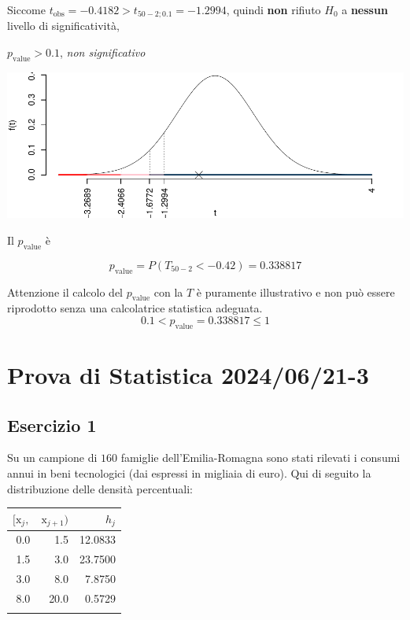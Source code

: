 \documentclass[
  11pt,
]{book}
\theoremstyle{mytheoremstyle}
\theoremstyle{mydefstyle}
\newenvironment{sol}
  {
  \begin{tcolorbox}[enhanced,breakable,arc=0.1mm,boxrule=1pt,colback=white,colframe=iblue,
  title=\bf \fontfamily{lmss}\selectfont \hspace{.5 cm} Soluzione,drop fuzzy shadow]

}{
\end{tcolorbox}
  }
\begin{document}
\begin{sol}
Siccome \(t_\text{obs}=-0.4182>t_{50-2;0.1}=-1.2994\), quindi \textbf{non} rifiuto \(H_0\) a \textbf{nessun} livello di significatività,

\(p_\text{value}>0.1\), \emph{non significativo}

\begin{center}\includegraphics{Esami_passati_con_soluzioni_files/figure-latex/2024-91-1} \end{center}

Il \(p_{\text{value}}\) è

\[ p_{\text{value}} = P(T_{50-2}<-0.42)=0.338817 \]

Attenzione il calcolo del \(p_\text{value}\) con la \(T\) è puramente illustrativo e non può essere riprodotto senza una calcolatrice statistica adeguata.\[
 0.1 < p_\text{value}= 0.338817 \leq 1 
\]

\end{sol}

\section{Prova di Statistica 2024/06/21-3}\label{prova-di-statistica-20240621-3}

\subsection{Esercizio 1}\label{esercizio-1-40}

Su un campione di \(160\) famiglie dell'Emilia-Romagna sono stati rilevati i consumi annui in beni tecnologici (dai espressi in migliaia di euro). Qui di seguito la distribuzione delle densità percentuali:

\begin{table}[H]
\centering
\begin{tabular}{rrr}
\toprule
$[\text{x}_j,$ & $\text{x}_{j+1})$ & $h_j$\\
\midrule
0.0 & 1.5 & 12.0833\\
1.5 & 3.0 & 23.7500\\
3.0 & 8.0 & 7.8750\\
8.0 & 20.0 & 0.5729\\
 &  & \\
\bottomrule
\end{tabular}
\end{table}
\end{document}

